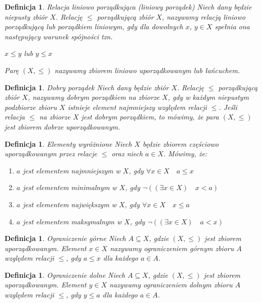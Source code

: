 \documentclass[12pt,a4paper]{report}
\newtheorem{definition}[theorem]{Definicja}
\begin{document}
\begin{definition}{Relacja liniowo porządkująca (liniowy porządek) \cite[Rozdział 2]{blaszczyk2007}}\label{def-porzadek-liniowy}
Niech dany będzie niepusty zbiór $X$. Relację $\leq$ porządkującą zbiór $X$, nazywamy relacją liniowo porządkującą lub porządkiem liniowym, gdy dla dowolnych $x$, $y \in X$ spełnia ona następujący warunek spójności tzn.

$x \leq y$ lub $y \leq x$

Parę $(X, \leq)$ nazywamy zbiorem liniowo uporządkowanym lub łańcuchem.
\end{definition}


\begin{definition}{Dobry porządek \cite[Rozdział 2]{blaszczyk2007}}
Niech dany będzie zbiór $X$. Relację $\leq$ porządkującą zbiór $X$, nazywamy dobrym porządkiem na zbiorze $X$, gdy w każdym niepustym podzbiorze zbioru $X$ istnieje element najmniejszy względem relacji $\leq$. Jeśli relacja $\leq$ na zbiorze $X$ jest dobrym porządkiem, to mówimy, że para $(X,\leq)$ jest zbiorem dobrze uporządkowanym.
\end{definition}

\begin{definition}{Elementy wyróżnione \cite[Rozdział 2]{blaszczyk2007}}
Niech $X$ będzie zbiorem częściowo uporządkowanym przez relacje $\leq$ oraz niech $a \in X$. Mówimy, że:
\begin{enumerate}
\item $a$ jest elementem najmniejszym w $X$, gdy $\forall x \in X \quad a \leq x$
\item $a$ jest elementem minimalnym w $X$, gdy $\lnot ((\exists x \in X) \quad x <a )$
\item $a$ jest elementem największym w $X$, gdy $\forall x \in X \quad x\leq a$
\item $a$ jest elementem maksymalnym w $X$, gdy $\lnot ((\exists x\in X) \quad a <x)$
\end{enumerate}

\end{definition}


\begin{definition}{Ograniczenie górne \cite[Rozdział 2]{blaszczyk2007}}
Niech $A \subseteq X$, gdzie $(X, \leq)$ jest zbiorem uporządkowanym. Element $x \in X$ nazywamy ograniczeniem górnym zbioru $A$ względem relacji $\leq$, gdy $a \leq x$ dla każdego $a \in A$. 
\end{definition}


\begin{definition}{Ograniczenie dolne \cite[Rozdział 2]{blaszczyk2007}}
Niech $A \subseteq X$, gdzie $(X, \leq)$ jest zbiorem uporządkowanym. Element $y \in X$ nazywamy ograniczeniem dolnym zbioru $A$ względem relacji $\leq$, gdy $y \leq a$ dla każdego $a \in A$. 
\end{definition}
\end{document}
